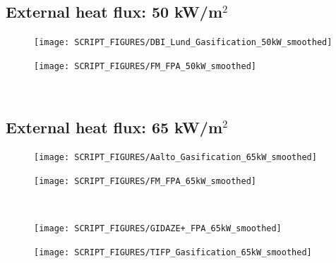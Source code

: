 \documentclass{book}
\begin{document}
\begin{landscape}
\newpage
\subsection{External heat flux: 50 kW/m$^2$}
\begin{minipage}{0.65\textwidth}
\begin{figure}[H]
{\texttt{[image: SCRIPT\_FIGURES/DBI\_Lund\_Gasification\_50kW\_smoothed]}}\\
\end{figure}
\end{minipage}
\begin{minipage}{0.35\textwidth}
\begin{figure}[H]
{\texttt{[image: SCRIPT\_FIGURES/FM\_FPA\_50kW\_smoothed]}}\\
\end{figure}
\end{minipage}\\
\vfill
\newpage
\subsection{External heat flux: 65 kW/m$^2$}
\begin{minipage}{0.65\textwidth}
\begin{figure}[H]
{\texttt{[image: SCRIPT\_FIGURES/Aalto\_Gasification\_65kW\_smoothed]}}\\
\end{figure}
\end{minipage}
\begin{minipage}{0.35\textwidth}
\begin{figure}[H]
{\texttt{[image: SCRIPT\_FIGURES/FM\_FPA\_65kW\_smoothed]}}\\
\end{figure}
\end{minipage}\\
\begin{minipage}{0.65\textwidth}
\begin{figure}[H]
{\texttt{[image: SCRIPT\_FIGURES/GIDAZE+\_FPA\_65kW\_smoothed]}}\\
\end{figure}
\end{minipage}
\begin{minipage}{0.35\textwidth}
\begin{figure}[H]
{\texttt{[image: SCRIPT\_FIGURES/TIFP\_Gasification\_65kW\_smoothed]}}\\
\end{figure}
\end{minipage}\\


\end{landscape}
\end{document}
